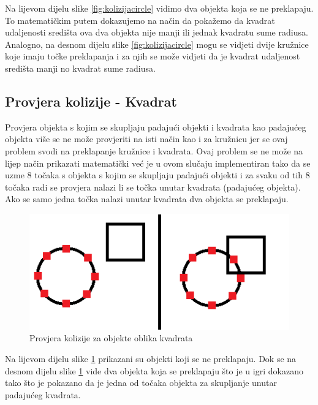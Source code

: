 \documentclass[times, utf8, zavrsni, numeric]{fer}
\begin{document}
	Na lijevom dijelu slike \ref{fig:kolizijacircle} vidimo dva objekta koja se ne preklapaju. To matematičkim putem dokazujemo na način da pokažemo da kvadrat udaljenosti središta ova dva objekta nije manji ili jednak kvadratu sume radiusa. Analogno, na desnom dijelu slike \ref{fig:kolizijacircle}
	mogu se vidjeti dvije kružnice koje imaju točke preklapanja i za njih se može vidjeti da je kvadrat udaljenost središta manji no kvadrat sume radiusa. 
	
	\subsection{Provjera kolizije - Kvadrat}
	Provjera objekta s kojim se skupljaju padajući objekti i kvadrata kao padajućeg objekta više se ne može provjeriti na isti način kao i za kružnicu jer se ovaj problem svodi na preklapanje kružnice i kvadrata.
	Ovaj problem se ne može na lijep način prikazati matematički već je u ovom slučaju implementiran tako da se uzme 8 točaka s objekta s kojim  se skupljaju padajući objekti i za svaku od tih 8 točaka radi se provjera nalazi li se točka unutar 
	kvadrata (padajućeg objekta). Ako se samo jedna točka nalazi unutar kvadrata dva objekta se preklapaju. 
	
		\begin{figure}[H]
			\includegraphics[scale=0.6]{"slike/squarekolizija.png"} 
			\centering
			\caption{Provjera kolizije za objekte oblika kvadrata}
			\label{fig:kolizijasquare}
		\end{figure}
		Na lijevom dijelu slike \ref{fig:kolizijasquare} prikazani su objekti koji se ne preklapaju. Dok se na desnom dijelu slike \ref{fig:kolizijasquare} vide dva objekta koja se preklapaju što je u igri dokazano tako što je pokazano da je jedna od točaka objekta za skupljanje unutar padajućeg kvadrata.
	
\end{document}

